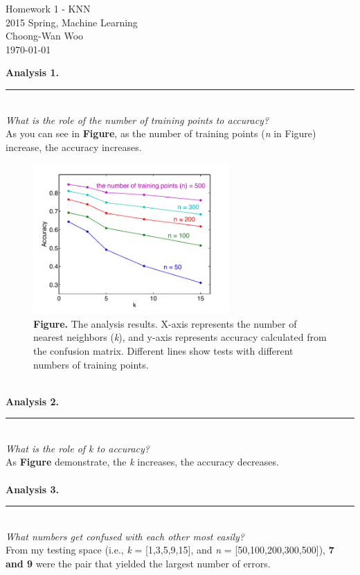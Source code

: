 \documentclass[letterpaper,11pt,notitlepage]{article}
\begin{document}
\begin{center}
	Homework 1 - KNN\\
	2015 Spring, Machine Learning\\
	Choong-Wan Woo\\
	\today\\
\end{center}

\hspace*{-1cm}\textbf{Analysis 1.}  \rule{10.5cm}{0.4pt}\\
\noindent\textit{What is the role of the number of training points to accuracy?}\\

\noindent As you can see in \textbf{Figure}, as the number of training points (\textit{n} in Figure) increase, the accuracy increases. 
\begin{figure}[ht!]
	\centering
	\includegraphics[width=7.5cm]{figure1_legend}
	\captionsetup{width=.8\textwidth}
	\caption{\textbf{Figure.} The analysis results. X-axis represents the number of nearest neighbors (\textit{k}), and y-axis represents accuracy calculated from the confusion matrix. Different lines show tests with different numbers of training points.}
\end{figure}\\

\hspace*{-1cm}\textbf{Analysis 2.}  \rule{10.5cm}{0.4pt}\\
\noindent\textit{What is the role of k to accuracy?}\\

\noindent As \textbf{Figure} demonstrate, the \textit{k} increases, the accuracy decreases.\\\\

\hspace*{-1cm}\textbf{Analysis 3.}  \rule{10.5cm}{0.4pt}\\
\noindent\textit{What numbers get confused with each other most easily?}\\

\noindent From my testing space (i.e., \textit{k} = [1,3,5,9,15], and \textit{n} = [50,100,200,300,500]), \textbf{7 and 9} were the pair that yielded the largest number of errors. 
\end{document}

